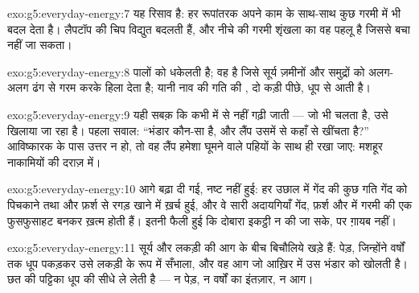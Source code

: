 \begin{solution}{exo:g5:everyday-energy:7}
यह रिसाव है: हर रूपांतरक अपने काम के साथ-साथ कुछ  गरमी में भी
बदल देता है। लैपटॉप की चिप विद्युत  बदलती हैं, और नीचे की गरमी
शृंखला का वह पहलू है जिससे बचा नहीं जा सकता।
\end{solution}

\begin{solution}{exo:g5:everyday-energy:8}
पालों को  धकेलती है;  वह  है जिसे सूर्य ज़मीनों और समुद्रों
को अलग-अलग ढंग से गरम करके हिला देता है; यानी नाव की गति की ,
दो कड़ी पीछे, धूप से आती है।
\end{solution}

\begin{solution}{exo:g5:everyday-energy:9}
यही सबक़ कि  कभी  में से नहीं गढ़ी जाती --- जो भी चलता है, उसे
खिलाया जा रहा है। पहला सवाल: ``भंडार कौन-सा है, और लैंप उसमें से
कहाँ से खींचता है?'' आविष्कारक के पास उत्तर न हो, तो वह लैंप हमेशा
घूमने वाले पहियों के साथ ही रखा जाए: मशहूर नाकामियों की दराज़ में।
\end{solution}

\begin{solution}{exo:g5:everyday-energy:10}
 आगे बढ़ा दी गई, नष्ट नहीं हुई: हर उछाल में गेंद की कुछ गति
 गेंद को पिचकाने तथा  और फ़र्श से रगड़ खाने में ख़र्च हुई, और
वे सारी अदायगियाँ गेंद, फ़र्श और  में गरमी की एक फुसफुसाहट बनकर
ख़त्म होती हैं। इतनी फैली हुई कि दोबारा इकट्ठी न की जा सके, पर ग़ायब
नहीं।
\end{solution}

\begin{solution}{exo:g5:everyday-energy:11}
सूर्य और लकड़ी की आग के बीच बिचौलिये खड़े हैं: पेड़, जिन्होंने वर्षों
तक धूप पकड़कर उसे लकड़ी के रूप में सँभाला, और वह आग जो आख़िर में उस
भंडार को खोलती है। छत की पट्टिका धूप की  सीधे ले लेती है ---
न पेड़, न वर्षों का इंतज़ार, न आग।
\end{solution}
